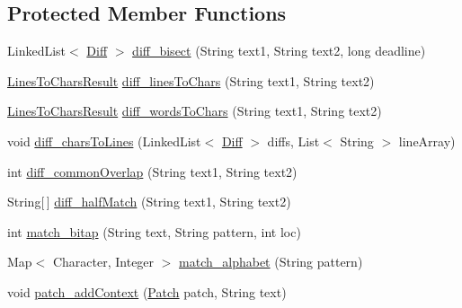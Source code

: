 \subsection*{Protected Member Functions}
\begin{DoxyCompactItemize}
\item 
Linked\+List$<$ \hyperlink{classname_1_1fraser_1_1neil_1_1plaintext_1_1diff__match__patch_1_1Diff}{Diff} $>$ \hyperlink{classname_1_1fraser_1_1neil_1_1plaintext_1_1diff__match__patch_a74de60fb7f62a714bb1ff8d24679919e}{diff\+\_\+bisect} (String text1, String text2, long deadline)
\item 
\hyperlink{classname_1_1fraser_1_1neil_1_1plaintext_1_1diff__match__patch_1_1LinesToCharsResult}{Lines\+To\+Chars\+Result} \hyperlink{classname_1_1fraser_1_1neil_1_1plaintext_1_1diff__match__patch_a9093987d32dbbe45e8dc547329ce1dac}{diff\+\_\+lines\+To\+Chars} (String text1, String text2)
\item 
\hyperlink{classname_1_1fraser_1_1neil_1_1plaintext_1_1diff__match__patch_1_1LinesToCharsResult}{Lines\+To\+Chars\+Result} \hyperlink{classname_1_1fraser_1_1neil_1_1plaintext_1_1diff__match__patch_a90b0f328290aada60cd49224a55806a9}{diff\+\_\+words\+To\+Chars} (String text1, String text2)
\item 
void \hyperlink{classname_1_1fraser_1_1neil_1_1plaintext_1_1diff__match__patch_a885b6eb52d3f8d05909c6e952c72aec2}{diff\+\_\+chars\+To\+Lines} (Linked\+List$<$ \hyperlink{classname_1_1fraser_1_1neil_1_1plaintext_1_1diff__match__patch_1_1Diff}{Diff} $>$ diffs, List$<$ String $>$ line\+Array)
\item 
int \hyperlink{classname_1_1fraser_1_1neil_1_1plaintext_1_1diff__match__patch_a0bd9a36a3831b6bb3106f2c958269f49}{diff\+\_\+common\+Overlap} (String text1, String text2)
\item 
String\mbox{[}$\,$\mbox{]} \hyperlink{classname_1_1fraser_1_1neil_1_1plaintext_1_1diff__match__patch_a561670700ebe3d66d5a6c9390fe75ea7}{diff\+\_\+half\+Match} (String text1, String text2)
\item 
int \hyperlink{classname_1_1fraser_1_1neil_1_1plaintext_1_1diff__match__patch_a83486cf24f738de7a02db96e86729a39}{match\+\_\+bitap} (String text, String pattern, int loc)
\item 
Map$<$ Character, Integer $>$ \hyperlink{classname_1_1fraser_1_1neil_1_1plaintext_1_1diff__match__patch_a9fc7cfe8cecded426063b670da5c4d69}{match\+\_\+alphabet} (String pattern)
\item 
void \hyperlink{classname_1_1fraser_1_1neil_1_1plaintext_1_1diff__match__patch_a980700e16581de1848118de0b29086c8}{patch\+\_\+add\+Context} (\hyperlink{classname_1_1fraser_1_1neil_1_1plaintext_1_1diff__match__patch_1_1Patch}{Patch} patch, String text)
\end{DoxyCompactItemize}
